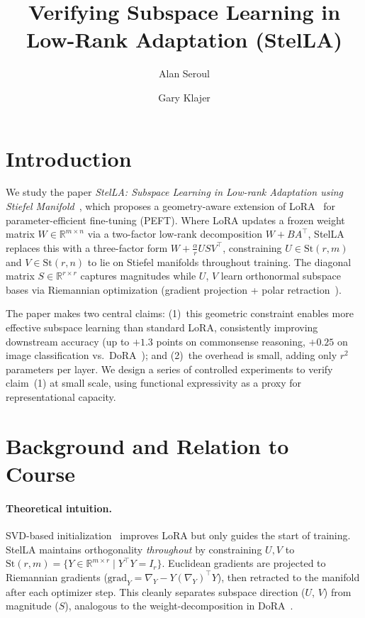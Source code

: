 \documentclass[11pt, a4paper]{article}
\title{Verifying Subspace Learning in Low-Rank Adaptation (StelLA)}
\author{Alan Seroul \and Gary Klajer}
\date{}
\begin{document}
\maketitle

\section{Introduction}

We study the paper \textit{StelLA: Subspace Learning in Low-rank Adaptation using Stiefel Manifold}~\cite{stella}, which proposes a geometry-aware extension of LoRA~\cite{lora} for parameter-efficient fine-tuning (PEFT). Where LoRA updates a frozen weight matrix $W \in \mathbb{R}^{m \times n}$ via a two-factor low-rank decomposition $W + BA^\top$, StelLA replaces this with a three-factor form $W + \frac{\alpha}{r} U S V^\top$, constraining $U \in \mathrm{St}(r,m)$ and $V \in \mathrm{St}(r,n)$ to lie on Stiefel manifolds throughout training. The diagonal matrix $S \in \mathbb{R}^{r \times r}$ captures magnitudes while $U$, $V$ learn orthonormal subspace bases via Riemannian optimization (gradient projection + polar retraction~\cite{absil}).

The paper makes two central claims: (1)~this geometric constraint enables more effective subspace learning than standard LoRA, consistently improving downstream accuracy (up to $+1.3$ points on commonsense reasoning, $+0.25$ on image classification vs.\ DoRA~\cite{dora}); and (2)~the overhead is small, adding only $r^2$ parameters per layer. We design a series of controlled experiments to verify claim~(1) at small scale, using functional expressivity as a proxy for representational capacity.

\section{Background and Relation to Course}

\paragraph{Theoretical intuition.} SVD-based initialization~\cite{pissa} improves LoRA but only guides the start of training. StelLA maintains orthogonality \emph{throughout} by constraining $U, V$ to $\mathrm{St}(r, m) = \{Y \in \mathbb{R}^{m \times r} \mid Y^\top Y = I_r\}$. Euclidean gradients are projected to Riemannian gradients ($\mathrm{grad}_Y = \nabla_Y - Y(\nabla_Y)^\top Y$), then retracted to the manifold after each optimizer step. This cleanly separates subspace direction ($U$, $V$) from magnitude ($S$), analogous to the weight-decomposition in DoRA~\cite{dora}.
\end{document}
